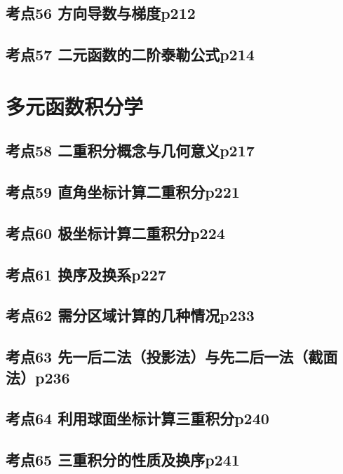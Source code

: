 \section{考点56 方向导数与梯度p212}

\section{考点57 二元函数的二阶泰勒公式p214}

\chapter{多元函数积分学}

\section{考点58 二重积分概念与几何意义p217}

\section{考点59 直角坐标计算二重积分p221}

\section{考点60 极坐标计算二重积分p224}

\section{考点61 换序及换系p227}

\section{考点62 需分区域计算的几种情况p233}

\section{考点63 先一后二法（投影法）与先二后一法（截面法）p236}

\section{考点64 利用球面坐标计算三重积分p240}

\section{考点65 三重积分的性质及换序p241}

